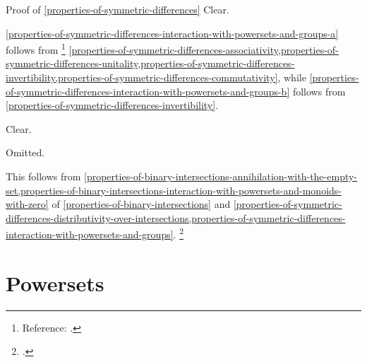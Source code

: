 \begin{Proof}{Proof of \cref{properties-of-symmetric-differences}}
    Clear.

    \cref{properties-of-symmetric-differences-interaction-with-powersets-and-groups-a} follows from%
    \footnote{%
        Reference: \cite{proof-wiki:symmetric-difference-on-power-set-forms-abelian-group}.
    } %
    \cref{properties-of-symmetric-differences-associativity,properties-of-symmetric-differences-unitality,properties-of-symmetric-differences-invertibility,properties-of-symmetric-differences-commutativity}, while \cref{properties-of-symmetric-differences-interaction-with-powersets-and-groups-b} follows from \cref{properties-of-symmetric-differences-invertibility}.

    Clear.

    Omitted.

    This follows from \cref{properties-of-binary-intersections-annihilation-with-the-empty-set,properties-of-binary-intersections-interaction-with-powersets-and-monoids-with-zero} of \cref{properties-of-binary-intersections} and \cref{properties-of-symmetric-differences-distributivity-over-intersections,properties-of-symmetric-differences-interaction-with-powersets-and-groups}.%
    \footnote{%
        \cite{proof-wiki:symmetric-difference-with-intersection-forms-ring}.
        \par\vspace*{-1.75\baselineskip}
    }%
\end{Proof}
\section{Powersets}\label{section-powersets}
